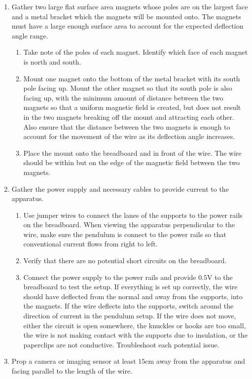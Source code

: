 \begin{enumerate}
	\item Gather two large flat surface area magnets whose poles are on the largest face and a metal bracket which the magnets will be mounted onto.
	The magnets must have a large enough surface area to account for the expected deflection angle range.
	\begin{enumerate}
		\item Take note of the poles of each magnet.
		Identify which face of each magnet is north and south.
		\item Mount one magnet onto the bottom of the metal bracket with its south pole facing up.
		Mount the other magnet so that its south pole is also facing up, with the minimum amount of distance between the two magnets so that a uniform magnetic field is created, but does not result in the two magnets breaking off the mount and attracting each other.
		Also ensure that the distance between the two magnets is enough to account for the movement of the wire as its deflection angle increases.
		\item Place the mount onto the breadboard and in front of the wire.
		The wire should be within but on the edge of the magnetic field between the two magnets.
	\end{enumerate}
	\item Gather the power supply and necessary cables to provide current to the apparatus.
	\begin{enumerate}
		\item Use jumper wires to connect the lanes of the supports to the power rails on the breadboard.
		When viewing the apparatus perpendicular to the wire, make sure the pendulum is connect to the power rails so that conventional current flows from right to left.
		\item Verify that there are no potential short circuits on the breadboard.
		\item Connect the power supply to the power rails and provide $0.5\si{\volt}$ to the breadboard to test the setup.
		If everything is set up correctly, the wire should have deflected from the normal and away from the supports, into the magnets.
		If the wire deflects into the supports, switch around the direction of current in the pendulum setup.
		If the wire does not move, either the circuit is open somewhere, the knuckles or hooks are too small, the wire is not making contact with the supports due to insulation, or the paperclips are not conductive.
		Troubleshoot each potential issue.
	\end{enumerate}
	\item Prop a camera or imaging sensor at least $15\si{\centi\meter}$ away from the apparatus and facing parallel to the length of the wire.

\end{enumerate}
